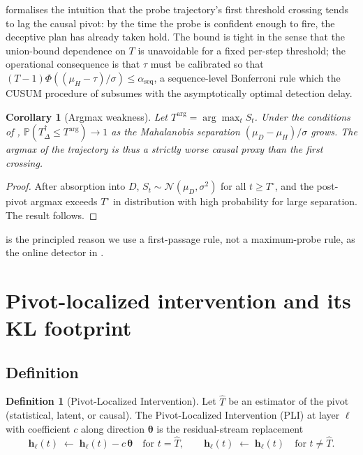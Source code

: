 \documentclass[11pt]{article}
\newtheorem{corollary}[theorem]{Corollary}
\theoremstyle{definition}
\newtheorem{definition}[theorem]{Definition}
\newcommand{\Prob}{\mathbb{P}}
\newcommand{\1}{\mathbf{1}}
\newcommand{\hh}{\bm{h}}
\newcommand{\thetab}{\bm{\theta}}
\begin{document}
 formalises the intuition that the probe trajectory's first threshold crossing tends to lag the causal pivot: by the time the probe is confident enough to fire, the deceptive plan has already taken hold. The bound is tight in the sense that the union-bound dependence on $T$ is unavoidable for a fixed per-step threshold; the operational consequence is that $\tau$ must be calibrated so that $(T-1)\Phi((\mu_H - \tau)/\sigma) \le \alpha_{\mathrm{seq}}$, a sequence-level Bonferroni rule which the CUSUM procedure of  subsumes with the asymptotically optimal detection delay.

\begin{corollary}[Argmax weakness]
\label{cor:argmax}
Let $T^{\arg} = \arg\max_t S_t$. Under the conditions of ,
$\Prob(T^{\dagger}_{\Delta} \le T^{\arg}) \to 1$ as the Mahalanobis separation $(\mu_D - \mu_H)/\sigma$ grows. The argmax of the trajectory is thus a strictly worse causal proxy than the first crossing.
\end{corollary}

\begin{proof}
After absorption into $D$, $S_t \sim \mathcal{N}(\mu_D, \sigma^2)$ for all $t \ge T^{\circ}$, and the post-pivot argmax exceeds $T^{\circ}$ in distribution with high probability for large separation. The result follows.
\end{proof}

 is the principled reason we use a first-passage rule, not a maximum-probe rule, as the online detector in .

\section{Pivot-localized intervention and its KL footprint}
\label{sec:pli}

\subsection{Definition}

\begin{definition}[Pivot-Localized Intervention]
\label{def:pli}
Let $\widehat{T}$ be an estimator of the pivot (statistical, latent, or causal). The Pivot-Localized Intervention (PLI) at layer $\ell$ with coefficient $c$ along direction $\thetab$ is the residual-stream replacement
\[
\hh_{\ell}(t) \;\leftarrow\; \hh_{\ell}(t) - c\, \thetab \quad \text{for } t = \widehat{T}, \qquad
\hh_{\ell}(t) \;\leftarrow\; \hh_{\ell}(t) \quad \text{for } t \ne \widehat{T}.
\]
\end{definition}
\end{document}
